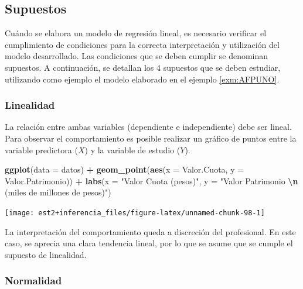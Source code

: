 \documentclass[
  11pt,
]{book}
\newenvironment{Shaded}{\begin{snugshade}}{\end{snugshade}}
\newcommand{\AttributeTok}[1]{\textcolor[rgb]{0.13,0.29,0.53}{#1}}
\newcommand{\FunctionTok}[1]{\textcolor[rgb]{0.13,0.29,0.53}{\textbf{#1}}}
\newcommand{\NormalTok}[1]{#1}
\newcommand{\SpecialCharTok}[1]{\textcolor[rgb]{0.81,0.36,0.00}{\textbf{#1}}}
\newcommand{\StringTok}[1]{\textcolor[rgb]{0.31,0.60,0.02}{#1}}
\theoremstyle{definition}
\theoremstyle{definition}
\theoremstyle{definition}
\theoremstyle{definition}
\theoremstyle{remark}
\begin{document}
\subsection{Supuestos}\label{regresion-lineal-simple-supuestos}

Cuándo se elabora un modelo de regresión lineal, es necesario verificar el cumplimiento de condiciones para la correcta interpretación y utilización del modelo desarrollado. Las condiciones que se deben cumplir se denominan supuestos. A continuación, se detallan los 4 supuestos que se deben estudiar, utilizando como ejemplo el modelo elaborado en el ejemplo \ref{exm:AFPUNO}.

\subsubsection{Linealidad}\label{regresion-lineal-simple-supuestos-linealidad}

La relación entre ambas variables (dependiente e independiente) debe ser lineal. Para observar el comportamiento es posible realizar un gráfico de puntos entre la variable predictora (\(X\)) y la variable de estudio (\(Y\)).

\begin{Shaded}
\begin{Highlighting}[]
\FunctionTok{ggplot}\NormalTok{(}\AttributeTok{data =}\NormalTok{ datos) }\SpecialCharTok{+}
  \FunctionTok{geom\_point}\NormalTok{(}\FunctionTok{aes}\NormalTok{(}\AttributeTok{x =}\NormalTok{ Valor.Cuota, }\AttributeTok{y =}\NormalTok{ Valor.Patrimonio)) }\SpecialCharTok{+}
  \FunctionTok{labs}\NormalTok{(}\AttributeTok{x =} \StringTok{"Valor Cuota (pesos)"}\NormalTok{, }\AttributeTok{y =} \StringTok{"Valor Patrimonio }\SpecialCharTok{\textbackslash{}n}\StringTok{ (miles de millones de pesos)"}\NormalTok{)}
\end{Highlighting}
\end{Shaded}

\begin{center}\texttt{[image: est2+inferencia\_files/figure-latex/unnamed-chunk-98-1]} \end{center}

La interpretación del comportamiento queda a discreción del profesional. En este caso, se aprecia una clara tendencia lineal, por lo que se asume que se cumple el supuesto de linealidad.

\subsubsection{Normalidad}\label{regresion-lineal-simple-supuestos-normalidad}
\end{document}
